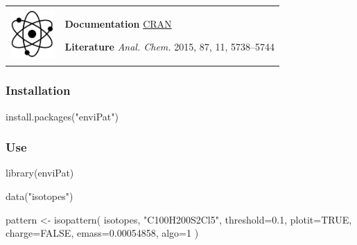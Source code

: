\documentclass[
]{book}
\newenvironment{Shaded}{\begin{snugshade}}{\end{snugshade}}
\newcommand{\AttributeTok}[1]{\textcolor[rgb]{0.77,0.63,0.00}{#1}}
\newcommand{\ConstantTok}[1]{\textcolor[rgb]{0.00,0.00,0.00}{#1}}
\newcommand{\DecValTok}[1]{\textcolor[rgb]{0.00,0.00,0.81}{#1}}
\newcommand{\FloatTok}[1]{\textcolor[rgb]{0.00,0.00,0.81}{#1}}
\newcommand{\FunctionTok}[1]{\textcolor[rgb]{0.00,0.00,0.00}{#1}}
\newcommand{\NormalTok}[1]{#1}
\newcommand{\OtherTok}[1]{\textcolor[rgb]{0.56,0.35,0.01}{#1}}
\newcommand{\StringTok}[1]{\textcolor[rgb]{0.31,0.60,0.02}{#1}}
\begin{document}
\begin{longtable}[]{@{}
  >{\raggedright\arraybackslash}p{}
  >{\raggedright\arraybackslash}p{}@{}}
\toprule\noalign{}
\endhead
\bottomrule\noalign{}
\endlastfoot
\includegraphics[width=\textwidth,height=0.70833in]{images/05.png} & \textbf{Documentation} \textbar{} \href{https://cran.r-project.org/web/packages/enviPat/enviPat.pdf}{CRAN}

\textbf{Literature} \textbar{} \emph{Anal. Chem.} 2015, 87, 11, 5738--5744 \\
\end{longtable}

\hfill\break

\hypertarget{installation-2}{%
\subsubsection*{Installation}\label{installation-2}}

\begin{Shaded}
\begin{Highlighting}[]
\FunctionTok{install.packages}\NormalTok{(}\StringTok{"enviPat"}\NormalTok{)}
\end{Highlighting}
\end{Shaded}

\hypertarget{use-1}{%
\subsubsection*{Use}\label{use-1}}

\begin{Shaded}
\begin{Highlighting}[]
\FunctionTok{library}\NormalTok{(enviPat)}

\FunctionTok{data}\NormalTok{(}\StringTok{"isotopes"}\NormalTok{)}

\NormalTok{pattern }\OtherTok{\textless{}{-}} \FunctionTok{isopattern}\NormalTok{(}
\NormalTok{  isotopes,}
  \StringTok{"C100H200S2Cl5"}\NormalTok{,}
  \AttributeTok{threshold=}\FloatTok{0.1}\NormalTok{,}
  \AttributeTok{plotit=}\ConstantTok{TRUE}\NormalTok{,}
  \AttributeTok{charge=}\ConstantTok{FALSE}\NormalTok{,}
  \AttributeTok{emass=}\FloatTok{0.00054858}\NormalTok{,}
  \AttributeTok{algo=}\DecValTok{1}
\NormalTok{)}
\end{Highlighting}
\end{Shaded}
\end{document}
